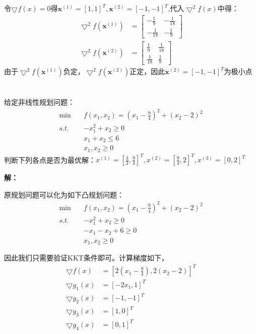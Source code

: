 \documentclass[a4paper]{article}
\begin{document}
令$\bigtriangledown f(x)=0$得$\textbf{x}^{(1)}=[1,1]^T,\textbf{x}^{(2)}=[-1,-1]^T$,代入$\bigtriangledown^2 f(x)$中得：
\begin{equation}
\begin{aligned}
\bigtriangledown^2 f(\textbf{x}^{(1)}) &= 
\left[
\begin{array}{cc}
-\frac{1}{9} & -\frac{1}{18} \\
-\frac{1}{18}  & -\frac{1}{9}
\end{array}
\right] \\
\bigtriangledown^2 f(\textbf{x}^{(2)}) &= 
\left[
\begin{array}{cc}
\frac{1}{9} & \frac{1}{18} \\
\frac{1}{18}  & \frac{1}{9}
\end{array}
\right]
\end{aligned}
\end{equation}
由于$\bigtriangledown^2 f(\textbf{x}^{(1)})$负定，$\bigtriangledown^2 f(\textbf{x}^{(2)})$正定，因此$\textbf{x}^{(2)}=[-1,-1]^T$为极小点

\section{}
给定非线性规划问题：
\begin{equation*}
\begin{aligned}
\min\quad &f(x_1,x_2)=(x_1-\frac{9}{4})^2+(x_2-2)^2 \\
s.t.\quad &-x_1^2+x_2\ge 0 \\
&x_1+x_2\le 6 \\
&x_1,x_2\ge 0
\end{aligned}
\end{equation*}
判断下列各点是否为最优解：$x^{(1)}=\left[\frac{3}{2},\frac{9}{4}\right]^T,x^{(2)}=\left[\frac{9}{4},2\right]^T,x^{(3)}=[0,2]^T$

\textbf{解：}

原规划问题可以化为如下凸规划问题：
\begin{equation*}
\begin{aligned}
\min\quad &f(x_1,x_2)=(x_1-\frac{9}{4})^2+(x_2-2)^2 \\
s.t.\quad &-x_1^2+x_2\ge 0 \\
&-x_1-x_2+6 \ge 0 \\
&x_1,x_2 \ge 0
\end{aligned}
\end{equation*}

因此我们只需要验证KKT条件即可。计算梯度如下，
\begin{equation}
\begin{aligned}
\bigtriangledown f(x) &=\left[2(x_1-\frac{9}{4}),2(x_2-2)\right]^T \\
\bigtriangledown g_1(x)&=[-2x_1,1]^T \\
\bigtriangledown g_2(x)&=[-1,-1]^T \\
\bigtriangledown g_3(x)&=[1,0]^T \\
\bigtriangledown g_4(x)&=[0,1]^T \\ 
\end{aligned}
\end{equation}
\end{document}
